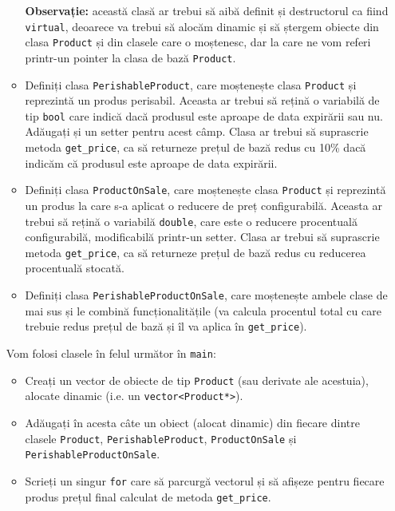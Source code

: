 \begin{enumerate}
\begin{itemize}
        \textbf{Observație:} această clasă ar trebui să aibă definit și destructorul ca fiind \texttt{virtual}, deoarece va trebui să alocăm dinamic și să ștergem obiecte din clasa \texttt{Product} și din clasele care o moștenesc, dar la care ne vom referi printr-un pointer la clasa de bază \texttt{Product}.

        \item Definiți clasa \texttt{PerishableProduct}, care moștenește clasa \texttt{Product} și reprezintă un produs perisabil. Aceasta ar trebui să rețină o variabilă de tip \texttt{bool} care indică dacă produsul este aproape de data expirării sau nu. Adăugați și un setter pentru acest câmp. Clasa ar trebui să suprascrie metoda \texttt{get\_price}, ca să returneze prețul de bază redus cu 10\% dacă indicăm că produsul este aproape de data expirării.

        \item Definiți clasa \texttt{ProductOnSale}, care moștenește clasa \texttt{Product} și reprezintă un produs la care s-a aplicat o reducere de preț configurabilă. Aceasta ar trebui să rețină o variabilă \texttt{double}, care este o reducere procentuală configurabilă, modificabilă printr-un setter. Clasa ar trebui să suprascrie metoda \texttt{get\_price}, ca să returneze prețul de bază redus cu reducerea procentuală stocată.
        
        \item Definiți clasa \texttt{PerishableProductOnSale}, care moștenește ambele clase de mai sus și le combină funcționalitățile (va calcula procentul total cu care trebuie redus prețul de bază și îl va aplica în \texttt{get\_price}).
    \end{itemize}

    Vom folosi clasele în felul următor în \texttt{main}:
    \begin{itemize}
        \item Creați un vector de obiecte de tip \texttt{Product} (sau derivate ale acestuia), alocate dinamic (i.e. un \texttt{vector<Product*>}).

        \item Adăugați în acesta câte un obiect (alocat dinamic) din fiecare dintre clasele \texttt{Product}, \texttt{PerishableProduct}, \texttt{ProductOnSale} și \\
        \texttt{PerishableProductOnSale}.

        \item Scrieți un singur \texttt{for} care să parcurgă vectorul și să afișeze pentru fiecare produs prețul final calculat de metoda \texttt{get\_price}.


\end{itemize}
\end{enumerate}
